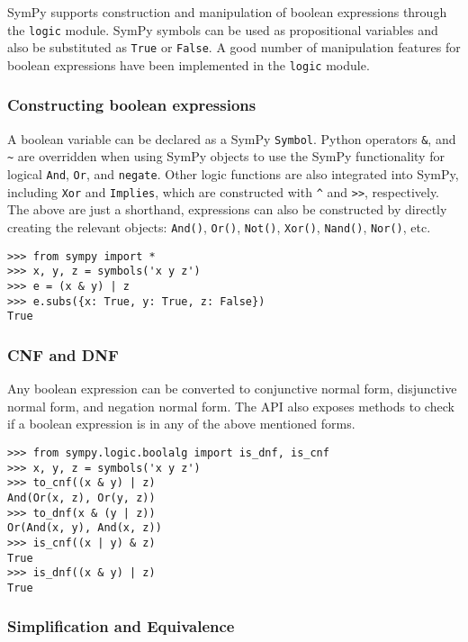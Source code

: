 
SymPy supports construction and manipulation of boolean expressions
through the \texttt{logic} module. SymPy symbols can be used as
propositional variables and also be substituted as \texttt{True}
or \texttt{False}. A good number of manipulation features for boolean
expressions have been implemented in the \texttt{logic} module.

\subsubsection{Constructing boolean expressions}

A boolean variable can be declared as a SymPy \verb|Symbol|. Python operators
\texttt{\&}, \texttt{\textbar{}} and \texttt{\textasciitilde{}} are overridden
when using SymPy objects
to use the SymPy functionality for logical \texttt{And}, \texttt{Or}, and
\texttt{negate}.  Other logic functions are also integrated into SymPy,
including \texttt{Xor} and \texttt{Implies}, which are constructed with
\texttt{\^{}} and \texttt{\textgreater{}\textgreater{}}, respectively.  The above
are just a shorthand, expressions can also be constructed by directly creating
the relevant objects: \verb|And()|, \verb|Or()|, \verb|Not()|, \verb|Xor()|,
\verb|Nand()|, \verb|Nor()|, etc.

\begin{verbatim}
>>> from sympy import *
>>> x, y, z = symbols('x y z')
>>> e = (x & y) | z
>>> e.subs({x: True, y: True, z: False})
True
\end{verbatim}

\subsubsection{CNF and DNF}

Any boolean expression can be converted to conjunctive normal form, disjunctive
normal form, and negation normal form. The API also exposes methods to check if
a boolean expression is in any of the above mentioned forms.

\begin{verbatim}
>>> from sympy.logic.boolalg import is_dnf, is_cnf
>>> x, y, z = symbols('x y z')
>>> to_cnf((x & y) | z)
And(Or(x, z), Or(y, z))
>>> to_dnf(x & (y | z))
Or(And(x, y), And(x, z))
>>> is_cnf((x | y) & z)
True
>>> is_dnf((x & y) | z)
True
\end{verbatim}

\subsubsection{Simplification and Equivalence}

